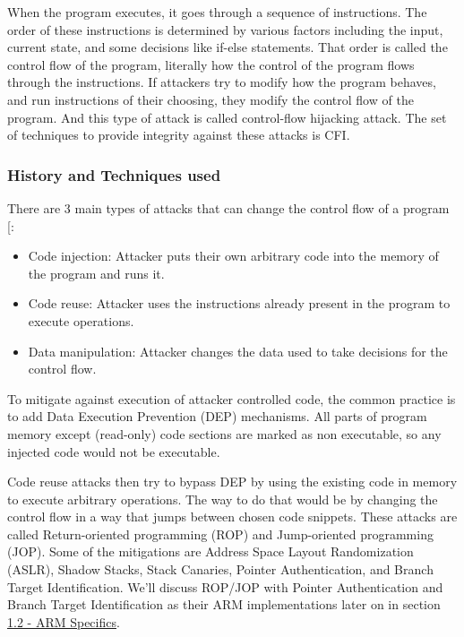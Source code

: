 \documentclass[a4paper, nobind]{templates/ociamthesis}
\providecommand{\tightlist}{%
  \setlength{\itemsep}{0pt}\setlength{\parskip}{0pt}}
\begin{document}
When the program executes, it goes through a sequence of instructions. The order
of these instructions is determined by various factors including the input, current state,
and some decisions like if-else statements. That order is called the control flow
of the program, literally how the control of the program flows through the instructions.
If attackers try to modify how the program behaves, and run instructions
of their choosing, they modify the control flow of the program. And this type of attack is
called control-flow hijacking attack.
The set of techniques to provide integrity against these attacks is CFI.

\subsubsection{History and Techniques used}\label{history-and-techniques-used}

There are 3 main types of attacks that can change the control flow of a program {[}\citeproc{ref-sok}{5}{]}:

\begin{itemize}
\tightlist
\item
  Code injection: Attacker puts their own arbitrary code into the memory of the program and runs it.
\item
  Code reuse: Attacker uses the instructions already present in the program to execute operations.
\item
  Data manipulation: Attacker changes the data used to take decisions for the control flow.
\end{itemize}

To mitigate against execution of attacker controlled code, the common practice is
to add Data Execution Prevention (DEP) mechanisms. All parts of program memory except
(read-only) code sections are marked as non executable, so any injected code would not be executable.

Code reuse attacks then try to bypass DEP by using the existing code in memory to
execute arbitrary operations. The way to do that would be by changing the control
flow in a way that jumps between chosen code snippets. These attacks are called
Return-oriented programming (ROP) and Jump-oriented programming (JOP).
Some of the mitigations are Address Space Layout Randomization (ASLR),
Shadow Stacks, Stack Canaries, Pointer Authentication, and Branch Target Identification.
We'll discuss ROP/JOP with Pointer Authentication and Branch Target
Identification as their ARM implementations later on in section \hyperref[arm-specifics]{1.2 - ARM Specifics}.
\end{document}

